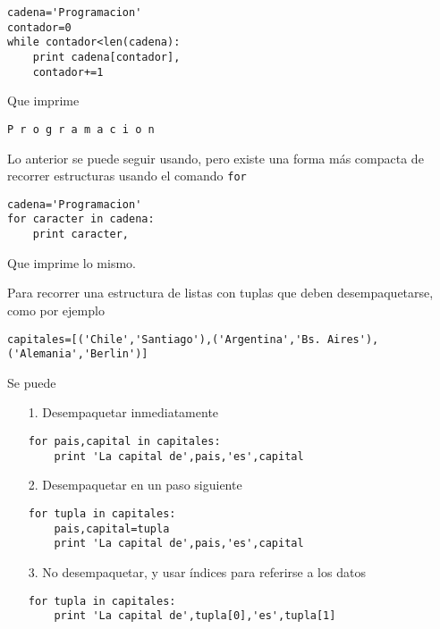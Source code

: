 \begin{lstlisting}[style=consola]
cadena='Programacion'
contador=0
while contador<len(cadena):
    print cadena[contador],
    contador+=1
\end{lstlisting}

Que imprime
\begin{lstlisting}[style=consola]
P r o g r a m a c i o n
\end{lstlisting}

Lo anterior se puede seguir usando, pero existe una forma más compacta de recorrer estructuras usando el comando \texttt{for}

\begin{lstlisting}[style=consola]
cadena='Programacion'
for caracter in cadena:
    print caracter,
\end{lstlisting}

Que imprime lo mismo.

Para recorrer una estructura de listas con tuplas que deben desempaquetarse, como por ejemplo
\begin{lstlisting}[style=consola]
capitales=[('Chile','Santiago'),('Argentina','Bs. Aires'),('Alemania','Berlin')]
\end{lstlisting}
Se puede
\begin{itemize}
    \item[1.] Desempaquetar inmediatamente 
    \begin{lstlisting}[style=consola]
for pais,capital in capitales:
    print 'La capital de',pais,'es',capital
    \end{lstlisting}
    
    \item[2.] Desempaquetar en un paso siguiente
    \begin{lstlisting}[style=consola]
for tupla in capitales:
    pais,capital=tupla
    print 'La capital de',pais,'es',capital
    \end{lstlisting}
    
    \item[3.] No desempaquetar, y usar índices para referirse a los datos
    \begin{lstlisting}[style=consola]
for tupla in capitales:
    print 'La capital de',tupla[0],'es',tupla[1]
    \end{lstlisting}
\end{itemize}